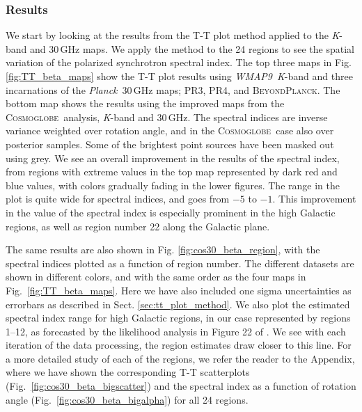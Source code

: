\documentclass[twocolumn]{../../common/aa}
\def\WMAPnine{\emph{WMAP9}}
\def\Planck{\emph{Planck}}
\newcommand{\bp}{\textsc{BeyondPlanck}}
\newcommand{\cosmoglobe}{\textsc{Cosmoglobe}}
\newcommand{\K}[0]{\textit K}
\begin{document}
\subsubsection{Results}
\label{sec:tt_plot_results}

We start by looking at the results from the T-T plot method applied to the \K-band and 30\,GHz maps. We apply the method to the 24 regions to see the spatial variation of the polarized synchrotron spectral index. The top three maps in Fig. \ref{fig:TT_beta_maps} show the T-T plot results using \WMAPnine\ \K-band and three incarnations of the \Planck\ 30\,GHz maps; PR3, PR4, and \bp. The bottom map shows the results using the improved maps from the \cosmoglobe\ analysis, \K-band and 30\,GHz. The spectral indices are inverse variance weighted over rotation angle, and in the \cosmoglobe\ case also over posterior samples. Some of the brightest point sources have been masked out using grey. We see an overall improvement in the results of the spectral index, from regions with extreme values in the top map represented by dark red and blue values, with colors gradually fading in the lower figures. The range in the plot is quite wide for spectral indices, and goes from $-5$ to $-1$. This improvement in the value of the spectral index is especially prominent in the high Galactic regions, as well as region  number 22 along the Galactic plane.

The same results are also shown in Fig. \ref{fig:cos30_beta_region}, with the spectral indices plotted as a function of region number. The different datasets are shown in different colors, and with the same order as the four maps in Fig.~\ref{fig:TT_beta_maps}. Here we have also included one sigma uncertainties as errorbars as described in Sect. \ref{sec:tt_plot_method}. We also plot the estimated spectral index range for high Galactic regions, in our case represented by regions 1--12, as forecasted by the likelihood analysis in Figure 22 of \citet{planck2016-l05}. We see with each iteration of the data processing, the region estimates draw closer to this line.
For a more detailed study of each of the regions, we refer the reader to the Appendix, where we have shown the corresponding T-T scatterplots (Fig.~\ref{fig:cos30_beta_bigscatter}) and the spectral index as a function of rotation angle (Fig.~\ref{fig:cos30_beta_bigalpha}) for all 24 regions.
\end{document}

